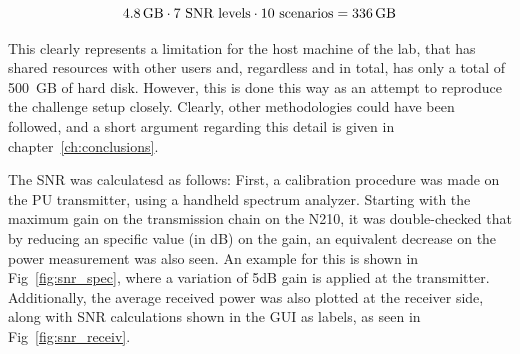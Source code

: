 \begin{equation}
    \SI{4.8}{\giga\byte} \cdot 7 \text{ SNR levels} \cdot 10 \text{ scenarios} = \SI{336}{\giga\byte}
\end{equation}

This clearly represents a limitation for the host machine of the lab, that has shared resources with other users and, regardless and in total, has only a total of \SI{500}{GB} of hard disk. However, this is done this way as an attempt to reproduce the challenge setup closely. Clearly, other methodologies could have been followed, and a short argument regarding this detail is given in chapter~\ref{ch:conclusions}.

The \ac{SNR} was calculatesd as follows: First, a calibration procedure was made on the \ac{PU} transmitter, using a handheld spectrum analyzer. Starting with the maximum gain on the transmission chain on the N210, it was double-checked that by reducing an specific value (in dB) on the gain, an equivalent decrease on the power measurement was also seen. An example for this is shown in Fig~\ref{fig:snr_spec}, where a variation of 5dB gain is applied at the transmitter. Additionally, the average received power was also plotted at the receiver side, along with SNR calculations shown in the GUI as labels, as seen in Fig~\ref{fig:snr_receiv}.

